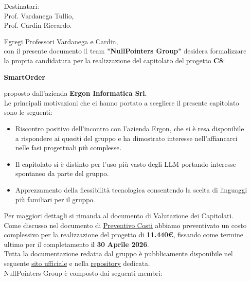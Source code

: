 \documentclass{article}
\begin{document}
	\begin{center}
		\begin {minipage}{1.0\textwidth}
			Destinatari:\\
			Prof. Vardanega Tullio,\\
			Prof. Cardin Riccardo.\\
		\end{minipage}
	\end{center}
	Egregi Professori Vardanega e Cardin,\\
	con il presente documento il team \textbf{"NullPointers Group"} desidera formalizzare la propria candidatura per la realizzazione del  capitolato del progetto \textbf{C8}:\\
	\begin{center}
		\textbf{SmartOrder}
	\end{center}
	proposto dall'azienda \textbf{Ergon Informatica Srl}.\\
	Le principali motivazioni che ci hanno portato a scegliere il presente capitolato sono le seguenti:
	\begin {itemize}
		\item Riscontro positivo dell'incontro con l'azienda Ergon, che si è resa disponibile a rispondere ai quesiti del gruppo e ha dimostrato interesse nell'affiancarci nelle fasi progettuali più complesse.
		\item Il capitolato si è distinto per l'uso più vasto degli LLM portando interesse spontaneo da parte del gruppo.
		\item Apprezzamento della flessibilità tecnologica consentendo la scelta di linguaggi più familiari per il gruppo.
	\end {itemize} 
	Per maggiori dettagli si rimanda al documento di \underline{\href{https://nullpointersgroup.github.io/Documentazione/output/Candidatura/Valutazione_Capitolati.pdf}{Valutazione dei Capitolati}}.\\

	Come discusso nel documento di \underline{\href{https://nullpointersgroup.github.io/Documentazione/output/Candidatura/Preventivo_Costi.pdf}{Preventivo Costi}} abbiamo preventivato un costo complessivo per la realizzazione del progetto di \textbf{11.440€}, fissando come termine ultimo per il completamento il \textbf{30 Aprile 2026}.\\
	
	Tutta la documentazione redatta dal gruppo è pubblicamente disponibile nel seguente \underline{\href{https://nullpointersgroup.github.io/Documentazione}{sito ufficiale}} e nella \underline{\href{https://github.com/NullPointersGroup/Documentazione}{repository}} dedicata.\\
	NullPointers Group è composto dai seguenti membri:\newline
	
\end{document}
